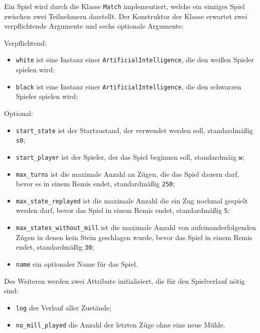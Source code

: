 \documentclass[11pt]{article}
\begin{document}
{Ein Spiel wird durch die Klasse \texttt{Match} implementiert, welche ein
einziges Spiel zwischen zwei Teilnehmern darstellt. Der Konstruktor der
Klasse erwartet zwei verpflichtende Argumente und sechs optionale
Argumente:

Verpflichtend:
\begin{itemize}
    \item \texttt{white} ist eine Instanz einer \texttt{ArtificialIntelligence}, die den weißen Spieler spielen wird;
    \item \texttt{black} ist eine Instanz einer \texttt{ArtificialIntelligence}, die den schwarzen Spieler spielen wird;
\end{itemize}

Optional:
\begin{itemize}
    \item \texttt{start\_state} ist der Startzustand, der verwendet werden soll, standardmäßig \texttt{s0};
    \item \texttt{start\_player} ist der Spieler, der das Spiel beginnen soll, standardmäig \texttt{w};
    \item \texttt{max\_turns} ist die maximale Anzahl an Zügen, die das Spiel dauern darf, bevor es in einem Remis endet, standardmäßig \texttt{250};
    \item \texttt{max\_state\_replayed} ist die maximale Anzahl die ein Zug nochmal gespielt werden darf, bevor das Spiel in einem Remis endet, standardmäßig \texttt{5};
    \item \texttt{max\_states\_without\_mill} ist die maximale Anzahl von aufeinanderfolgenden Zügen in denen kein Stein geschlagen wurde, bevor das Spiel in einem Remis endet, standardmäßig \texttt{30};
    \item \texttt{name} ein optionaler Name für das Spiel.
\end{itemize}

Des Weiteren werden zwei Attribute initialisiert, die für den
Spielverlauf nötig sind:
\begin{itemize}
    \item \texttt{log} der Verlauf aller Zustände;
    \item \texttt{no\_mill\_played} die Anzahl der letzten Züge ohne eine neue Mühle.
\end{itemize}

}
\end{document}
